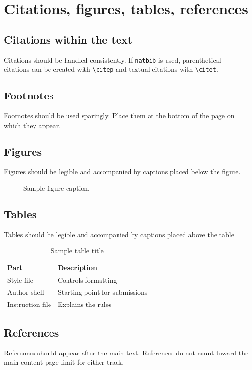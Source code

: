 \documentclass{article}
\begin{document}
\section{Citations, figures, tables, references}
\label{others}

\subsection{Citations within the text}
Citations should be handled consistently. If \verb|natbib| is used, parenthetical citations can be created with \verb|\citep| and textual citations with \verb|\citet|.

\subsection{Footnotes}
Footnotes should be used sparingly. Place them at the bottom of the page on which they appear.

\subsection{Figures}
Figures should be legible and accompanied by captions placed below the figure.

\begin{figure}[h]
\centering
\fbox{\rule[-.5cm]{0cm}{4cm} \rule[-.5cm]{4cm}{0cm}}
\caption{Sample figure caption.}
\end{figure}

\subsection{Tables}
Tables should be legible and accompanied by captions placed above the table.

\begin{table}[h]
\caption{Sample table title}
\centering
\begin{tabular}{ll}
\toprule
Part & Description \\
\midrule
Style file & Controls formatting \\
Author shell & Starting point for submissions \\
Instruction file & Explains the rules \\
\bottomrule
\end{tabular}
\end{table}

\subsection{References}
References should appear after the main text. References do not count toward the main-content page limit for either track.
\end{document}
